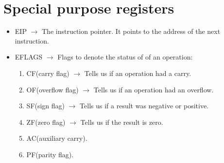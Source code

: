 \documentclass{article}
\begin{document}
\section{Special purpose registers}
\begin{itemize}
\item EIP $\rightarrow$ The instruction pointer. It points to the address of the next instruction.
\item EFLAGS $\rightarrow$ Flags to denote the status of of an operation:
\begin{enumerate}[label=$\bullet$]
\item CF(carry flag) $\rightarrow$ Tells us if an operation had a carry.
\item OF(overflow flag) $\rightarrow$ Tells us if an operation had an overflow.
\item SF(sign flag) $\rightarrow$ Tells us if a result was negative or positive.
\item ZF(zero flag) $\rightarrow$ Tells us if the result is zero.
\item AC(auxiliary carry).
\item PF(parity flag).
\end{enumerate}
\end{itemize}
\end{document}
